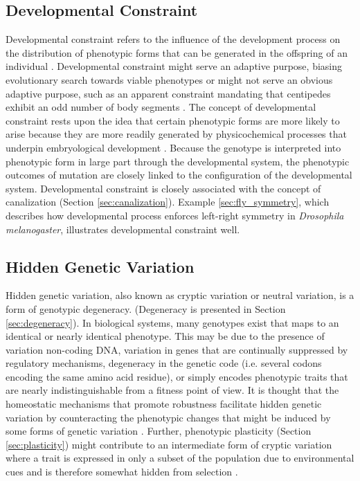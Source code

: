   
\subsection{Developmental Constraint} \label{sec:developmental_constraint}
Developmental constraint refers to the influence of the development process on the distribution of phenotypic forms that can be generated in the offspring of an individual \cite{Smith1985DevelopmentalBiology}. Developmental constraint might serve an adaptive purpose, biasing evolutionary search towards viable phenotypes \cite[pg 40]{Downing2015IntelligenceSystems} or might not serve an obvious adaptive purpose, such as an apparent constraint mandating that centipedes exhibit an odd number of body segments \cite{Arthur1999TheEvolution}. The concept of developmental constraint rests upon the idea that certain phenotypic forms are more likely to arise because they are more readily generated by physicochemical processes that underpin embryological development \cite{Smith1985DevelopmentalBiology}. Because the genotype is interpreted into phenotypic form in large part through the developmental system, the phenotypic outcomes of mutation are closely linked to the configuration of the developmental system. Developmental constraint is closely associated with the concept of canalization (Section \ref{sec:canalization}). Example \ref{sec:fly_symmetry}, which describes how developmental process enforces left-right symmetry in \textit{Drosophila melanogaster}, illustrates developmental constraint well.
 
        
\subsection{Hidden Genetic Variation} \label{sec:hidden_genetic_variation}
Hidden genetic variation, also known as cryptic variation or neutral variation, is a form of genotypic degeneracy. (Degeneracy is presented in Section \ref{sec:degeneracy}). In biological systems, many genotypes exist that maps to an identical or nearly identical phenotype. This may be due to the presence of variation non-coding DNA, variation in genes that are continually suppressed by regulatory mechanisms, degeneracy in the genetic code (i.e. several codons encoding the same amino acid residue), or simply encodes phenotypic traits that are nearly indistinguishable from a fitness point of view. It is thought that the homeostatic mechanisms that promote robustness facilitate hidden genetic variation by counteracting the phenotypic changes that might be induced by some forms of genetic variation \cite{Moczek2011TheInnovation}. Further, phenotypic plasticity (Section \ref{sec:plasticity}) might contribute to an intermediate form of cryptic variation where a trait is expressed in only a subset of the population due to environmental cues and is therefore somewhat hidden from selection \cite{Moczek2011TheInnovation}.
 

